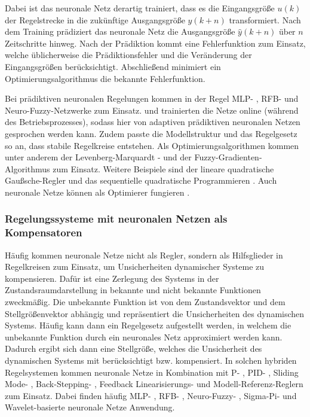 Dabei ist das neuronale Netz derartig trainiert, dass es die Eingangsgröße $u(k)$ der Regelstrecke in die zukünftige Ausgangsgröße $y(k+n)$ transformiert. Nach dem Training prädiziert das neuronale Netz die Ausgangsgröße $\hat{y}(k+n)$ über $n$ Zeitschritte hinweg. Nach der Prädiktion  kommt eine Fehlerfunktion zum Einsatz, welche üblicherweise die Prädiktionsfehler und die Veränderung der Eingangsgrößen berücksichtigt. Abschließend minimiert ein Optimierungsalgorithmus die bekannte Fehlerfunktion. 

Bei prädiktiven neuronalen Regelungen kommen in der Regel MLP- \cite{Mohammadzaheri.2010}, RFB- \cite{Alexandridis.2005} und Neuro-Fuzzy-Netzwerke \cite{Liu.2006} zum Einsatz. \cite{Parlos.2001} und \cite{Alexandridis.2005} trainierten die Netze online (während des Betriebsprozesses), sodass hier von adaptiven prädiktiven neuronalen Netzen gesprochen werden kann. Zudem passte \cite{Parlos.2001} die Modellstruktur und das Regelgesetz so an, dass stabile Regelkreise entstehen. Als Optimierungsalgorithmen kommen unter anderem der Levenberg-Marquardt \cite{Mohammadzaheri.2010}- und der Fuzzy-Gradienten-Algorithmus zum Einsatz. Weitere Beispiele sind der lineare quadratische Gaußsche-Regler \cite{KKaramodin.2009} und das sequentielle quadratische Programmieren \cite{Prasad.1998} \cite{Parlos.2001}. Auch neuronale Netze können als Optimierer fungieren \cite{KOKER.2006}.

\subsubsection{Regelungssysteme mit neuronalen Netzen als Kompensatoren}

Häufig kommen neuronale Netze nicht als Regler, sondern als Hilfsglieder in Regelkreisen zum Einsatz, um Unsicherheiten dynamischer Systeme zu kompensieren. Dafür ist eine Zerlegung des Systems in der Zustandsraumdarstellung in bekannte und nicht bekannte Funktionen zweckmäßig. Die unbekannte Funktion ist von dem Zustandsvektor und dem Stellgrößenvektor abhängig und repräsentiert die Unsicherheiten des dynamischen Systems. Häufig kann dann ein Regelgesetz aufgestellt werden, in welchem die unbekannte Funktion durch ein neuronales Netz approximiert werden kann. Dadurch ergibt sich dann eine Stellgröße, welches die Unsicherheit des dynamischen Systems mit berücksichtigt bzw. kompensiert. In solchen hybriden Regelsystemen kommen neuronale Netze in Kombination mit P- \cite{Ren.2009}, PID- \cite{Hong.2009}, Sliding Mode- \cite{Han.2009}, Back-Stepping- \cite{Jolly.2009}, Feedback Linearisierungs- \cite{Yang.2007} und Modell-Referenz-Reglern \cite{Zhao.2009} zum Einsatz. Dabei finden häufig MLP- \cite{Cheng.2009}, RFB- \cite{Yang.2007}, Neuro-Fuzzy- \cite{Han.2009}, Sigma-Pi- \cite{Hong.2009} und Wavelet-basierte neuronale Netze \cite{Hsu.2009} Anwendung.






